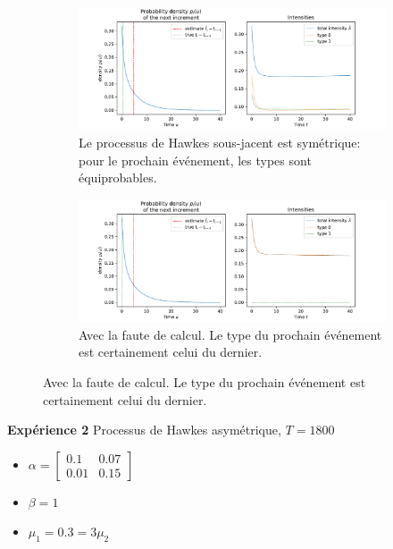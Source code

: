 \documentclass{beamer}
\begin{document}
\begin{frame}
\begin{figure}
	\begin{subfigure}{0.8\linewidth}
		\includegraphics[width=\linewidth]{../notebooks/decayrnn_2d_prediction_graphs_hidden128_NEW.pdf}
		\caption{Le processus de Hawkes sous-jacent est symétrique: pour le prochain événement, les types sont équiprobables.}
	\end{subfigure}
	\begin{subfigure}{0.8\linewidth}
		\includegraphics[width=\linewidth]{../notebooks/decayrnn_2d_prediction_graphs.pdf}
		\caption{Avec la faute de calcul. Le type du prochain événement est certainement celui du dernier.}
	\end{subfigure}
\end{figure}
\end{frame}

\begin{frame}
\textbf{Expérience 2} Processus de Hawkes asymétrique, $T = 1800$
\begin{itemize}
	\item $\alpha = \begin{bmatrix}0.1 & 0.07\\ 0.01 & 0.15\end{bmatrix}$
	\item $\beta = 1$
	\item $\mu_1 = \num{0.3} = 3\mu_2$
\end{itemize}
\end{frame}
\end{document}
